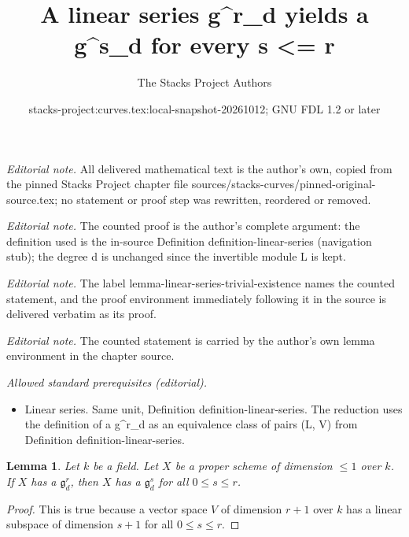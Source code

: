 \documentclass[10pt,a4paper]{amsart}
\title{A linear series g\textasciicircum{}r\_d yields a g\textasciicircum{}s\_d for every s <= r}
\author{The Stacks Project Authors}
\date{stacks-project:curves.tex:local-snapshot-20261012; GNU FDL 1.2 or later}
\theoremstyle{plain}
\newtheorem{lemma}[subsection]{Lemma}
\theoremstyle{definition}
\theoremstyle{remark}
\numberwithin{equation}{subsection}
\begin{document}
\maketitle
\noindent\textit{Editorial note.} All delivered mathematical text is the author's own, copied from the pinned Stacks Project chapter file sources/stacks-curves/pinned-original-source.tex; no statement or proof step was rewritten, reordered or removed.\par\medskip
\noindent\textit{Editorial note.} The counted proof is the author's complete argument: the definition used is the in-source Definition definition-linear-series (navigation stub); the degree d is unchanged since the invertible module L is kept.\par\medskip
\noindent\textit{Editorial note.} The label lemma-linear-series-trivial-existence names the counted statement, and the proof environment immediately following it in the source is delivered verbatim as its proof.\par\medskip
\noindent\textit{Editorial note.} The counted statement is carried by the author's own lemma environment in the chapter source.\par\medskip
\noindent\textit{Allowed standard prerequisites (editorial).}\begin{itemize}
\item Linear series. Same unit, Definition definition-linear-series. The reduction uses the definition of a g\textasciicircum{}r\_d as an equivalence class of pairs (L, V) from Definition definition-linear-series.
\end{itemize}\medskip
\begin{lemma}
\label{lemma-linear-series-trivial-existence}
Let $k$ be a field. Let $X$ be a proper scheme of dimension $\leq 1$ over $k$.
If $X$ has a $\mathfrak g^r_d$, then $X$ has a $\mathfrak g^s_d$ for
all $0 \leq s \leq r$.
\end{lemma}

\begin{proof}
This is true because a vector space $V$ of dimension $r + 1$
over $k$ has a linear subspace of dimension $s + 1$ for all
$0 \leq s \leq r$.
\end{proof}
\end{document}
